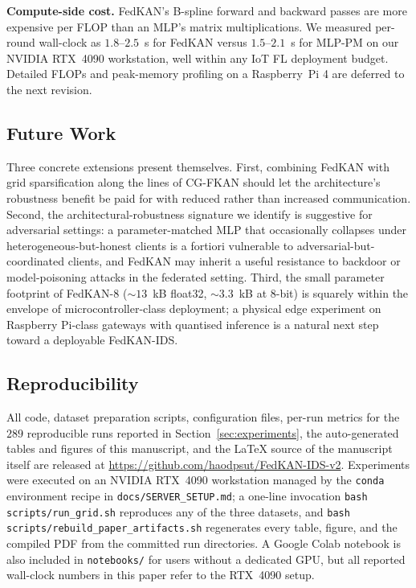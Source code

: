 \textbf{Compute-side cost.} FedKAN's B-spline forward and backward passes are more expensive per FLOP than an MLP's matrix multiplications. We measured per-round wall-clock as $1.8$--$2.5$~s for FedKAN versus $1.5$--$2.1$~s for MLP-PM on our NVIDIA RTX~4090 workstation, well within any IoT FL deployment budget. Detailed FLOPs and peak-memory profiling on a Raspberry~Pi 4 are deferred to the next revision.

\subsection{Future Work}

Three concrete extensions present themselves. First, combining FedKAN with grid sparsification along the lines of CG-FKAN \cite{yu2025cgfkan} should let the architecture's robustness benefit be paid for with reduced rather than increased communication. Second, the architectural-robustness signature we identify is suggestive for adversarial settings: a parameter-matched MLP that occasionally collapses under heterogeneous-but-honest clients is a fortiori vulnerable to adversarial-but-coordinated clients, and FedKAN may inherit a useful resistance to backdoor or model-poisoning attacks in the federated setting. Third, the small parameter footprint of FedKAN-8 ($\sim 13$~kB float32, $\sim 3.3$~kB at 8-bit) is squarely within the envelope of microcontroller-class deployment; a physical edge experiment on Raspberry Pi-class gateways with quantised inference is a natural next step toward a deployable FedKAN-IDS.

\subsection{Reproducibility}

All code, dataset preparation scripts, configuration files, per-run metrics for the $289$ reproducible runs reported in Section~\ref{sec:experiments}, the auto-generated tables and figures of this manuscript, and the \LaTeX{} source of the manuscript itself are released at \url{https://github.com/haodpsut/FedKAN-IDS-v2}. Experiments were executed on an NVIDIA RTX~4090 workstation managed by the \texttt{conda} environment recipe in \texttt{docs/SERVER\_SETUP.md}; a one-line invocation \texttt{bash scripts/run\_grid.sh} reproduces any of the three datasets, and \texttt{bash scripts/rebuild\_paper\_artifacts.sh} regenerates every table, figure, and the compiled PDF from the committed run directories. A Google Colab notebook is also included in \texttt{notebooks/} for users without a dedicated GPU, but all reported wall-clock numbers in this paper refer to the RTX~4090 setup.
